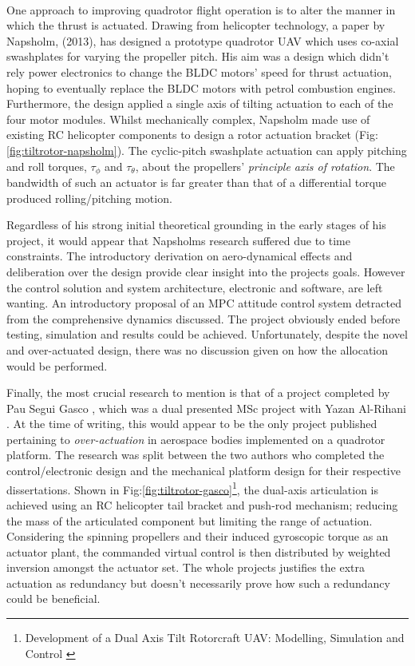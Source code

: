 \\
One approach to improving quadrotor flight operation is to alter the manner in which the thrust is actuated. Drawing from helicopter technology, a paper by Napsholm, (2013)\cite{napsholm}, has designed a prototype quadrotor UAV which uses co-axial swashplates for varying the propeller pitch. His aim was a design which didn't rely power electronics to change the BLDC motors' speed for thrust actuation, hoping to eventually replace the BLDC motors with petrol combustion engines. Furthermore, the design applied a single axis of tilting actuation to each of the four motor modules. Whilst mechanically complex, Napsholm made use of existing RC helicopter components to design a rotor actuation bracket (Fig:\ref{fig:tiltrotor-napsholm}). The cyclic-pitch swashplate actuation \cite{autonomousrobotspitch} can apply pitching and roll torques, $\tau_{\phi}$ and $\tau_{\theta}$, about the propellers' \emph{principle axis of rotation}. The bandwidth of such an actuator is far greater than that of a differential torque produced rolling/pitching motion.
\par
Regardless of his strong initial theoretical grounding in the early stages of his project, it would appear that Napsholms research suffered due to time constraints. The introductory derivation on aero-dynamical effects and deliberation over the design provide clear insight into the projects goals. However the control solution and system architecture, electronic and software, are left wanting. An introductory proposal of an MPC attitude control system detracted from the comprehensive dynamics discussed. The project obviously ended before testing, simulation and results could be achieved. Unfortunately, despite the novel and over-actuated design, there was no discussion given on how the allocation would be performed.
\par
Finally, the most crucial research to mention is that of a project completed by Pau Segui Gasco \cite{tiltgasco}, which was a dual presented MSc project with Yazan Al-Rihani \cite{tiltrihani}. At the time of writing, this would appear to be the only project published pertaining to \emph{over-actuation} in aerospace bodies implemented on a quadrotor platform. The research was split between the two authors who completed the control/electronic design and the mechanical platform design for their respective dissertations. Shown in Fig:\ref{fig:tiltrotor-gasco}\footnote{Development of a Dual Axis Tilt Rotorcraft UAV: Modelling, Simulation and Control \cite{tiltgasco}}, the dual-axis articulation is achieved using an RC helicopter tail bracket and push-rod mechanism; reducing the mass of the articulated component but limiting the range of actuation. Considering the spinning propellers and their induced gyroscopic torque as an actuator plant, the commanded virtual control is then distributed by weighted inversion amongst the actuator set. The whole projects justifies the extra actuation as redundancy but doesn't necessarily prove how such a redundancy could be beneficial.
